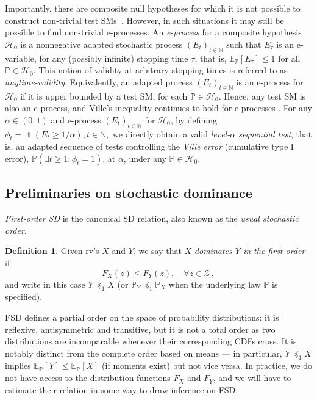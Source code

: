 \documentclass[12pt,twoside]{article}
\theoremstyle{plain}
\theoremstyle{definition}
\newtheorem{definition}{Definition}
\theoremstyle{remark}
\newcommand{\inparen}[1]{\left(#1\right)}
\DeclareMathOperator*{\indsymb}{\mathds{1}}
\newcommand{\indicator}[1]{\indsymb\inparen{#1}}
\newcommand{\N}{\mathbb{N}}
\newcommand{\calH}{\mathcal{H}}
\newcommand{\calZ}{\mathcal{Z}}
\newcommand{\Esymb}{\mathbb{E}}
\newcommand{\Psymb}{\mathbb{P}}
\newcommand{\Ex}[2]{\Esymb_{{#1}}\left[{#2}\right]}
\newcommand{\fsd}{\preceq_{1}}
\begin{document}
Importantly, there are composite null hypotheses for which it is not possible to construct non-trivial test SMs~\citep[e.g.,][]{ramdas2021testing,henzi2023rank}. 
However, in such situations it may still be possible to find non-trivial e-processes. 
An \emph{e-process} for a composite hypothesis $\calH_0$ is a nonnegative adapted stochastic process $(E_t)_{t \in \N}$ such that $E_\tau$ is an e-variable, for any (possibly infinite) stopping time $\tau$, that is, $\Ex{\Psymb}{E_\tau}\leq 1$ for all $\Psymb \in \calH_0$. 
This notion of validity at arbitrary stopping times is referred to as \emph{anytime-validity}. 
Equivalently, an adapted process $(E_t)_{t \in \N}$ is an e-process for $\calH_0$ if it is upper bounded by a test SM, for each $\Psymb \in \calH_0$. 
Hence, any test SM is also an e-process, and Ville's inequality continues to hold for e-processes \citep{ramdas2022game}.
For any $\alpha\in (0,1)$ and e-process $(E_t)_{t \in \N}$ for $\calH_0$, by defining $\phi_t = \indicator{E_t \ge 1/\alpha}, t\in \N,$ we directly obtain a valid \emph{level-$\alpha$ sequential test}, that is, an adapted sequence of tests controlling the \emph{Ville error} (cumulative type I error), $\Psymb(\exists t\geq 1: \phi_t=1)$, at $\alpha$, under any $\Psymb\in \calH_0$. 


\subsection{Preliminaries on stochastic dominance}\label{subsec:preliminaries_on_SD}

\emph{First-order SD} is the canonical SD relation, also known as the \emph{usual stochastic order}. 

\begin{definition}\label{def:FSD}
Given rv's $X$ and $Y$, we say that $X$ \emph{dominates $Y$ in the first order} if 
\begin{equation}\label{eq:def_FSD}
    F_X(z)\leq F_Y(z), \quad \forall z\in \calZ\,,
\end{equation}
and write in this case $Y \fsd X$ (or $\Psymb_Y \fsd \Psymb_X$ when the underlying law $\Psymb$ is specified).  
\end{definition}

FSD defines a partial order on the space of probability distributions: it is reflexive, antisymmetric and transitive, but it is not a total order as two distributions are incomparable whenever their corresponding CDFs cross. 
It is notably distinct from the complete order based on means --- in particular, $Y \fsd X$ implies $\Ex{\Psymb}{Y} \leq \Ex{\Psymb}{X}$ (if moments exist) but not vice versa.  
In practice, we do not have access to the distribution functions $F_X$ and $F_Y$, and we will have to estimate their relation in some way to draw inference on FSD. 
\end{document}
